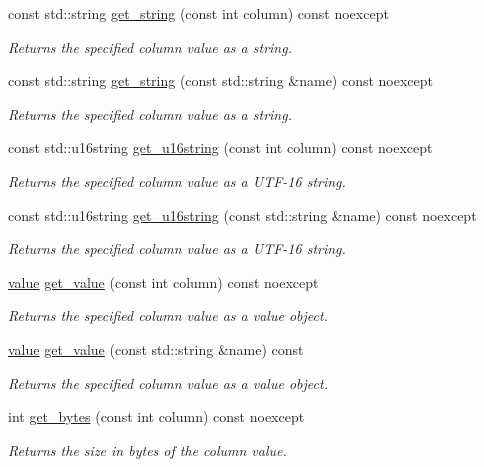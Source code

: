 \begin{DoxyCompactItemize}
const std\-::string \hyperlink{a00010_a8716fe92a821ebc0799097bd6cc6d53c}{get\-\_\-string} (const int column) const noexcept
\begin{DoxyCompactList}\small\item\em Returns the specified column value as a string. \end{DoxyCompactList}\item 
const std\-::string \hyperlink{a00010_ab9c842deb81d9eb20388746672a96d29}{get\-\_\-string} (const std\-::string \&name) const noexcept
\begin{DoxyCompactList}\small\item\em Returns the specified column value as a string. \end{DoxyCompactList}\item 
const std\-::u16string \hyperlink{a00010_abfef02b657c992a2d07e28a07e41e533}{get\-\_\-u16string} (const int column) const noexcept
\begin{DoxyCompactList}\small\item\em Returns the specified column value as a U\-T\-F-\/16 string. \end{DoxyCompactList}\item 
const std\-::u16string \hyperlink{a00010_af10d3ff33e5f4ee471bc14cc41ec86c1}{get\-\_\-u16string} (const std\-::string \&name) const noexcept
\begin{DoxyCompactList}\small\item\em Returns the specified column value as a U\-T\-F-\/16 string. \end{DoxyCompactList}\item 
\hyperlink{a00015}{value} \hyperlink{a00010_af776fbdf8dc1150b628b04eca10841f4}{get\-\_\-value} (const int column) const noexcept
\begin{DoxyCompactList}\small\item\em Returns the specified column value as a value object. \end{DoxyCompactList}\item 
\hyperlink{a00015}{value} \hyperlink{a00010_ad7835e8a981450975fee7771fa863ffe}{get\-\_\-value} (const std\-::string \&name) const
\begin{DoxyCompactList}\small\item\em Returns the specified column value as a value object. \end{DoxyCompactList}\item 
int \hyperlink{a00010_ac4404227950aca8d5f01255a5541dbb4}{get\-\_\-bytes} (const int column) const noexcept
\begin{DoxyCompactList}\small\item\em Returns the size in bytes of the column value. \end{DoxyCompactList}\item 

\end{DoxyCompactItemize}
